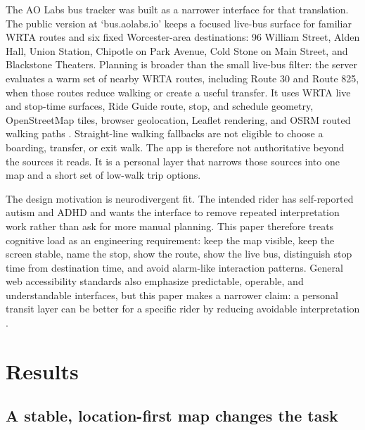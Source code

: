 \documentclass[12pt,letterpaper]{article}
\begin{document}
The AO Labs bus tracker was built as a narrower interface for that translation. The public version at `bus.aolabs.io' keeps a focused live-bus surface for familiar WRTA routes and six fixed Worcester-area destinations: 96 William Street, Alden Hall, Union Station, Chipotle on Park Avenue, Cold Stone on Main Street, and Blackstone Theaters. Planning is broader than the small live-bus filter: the server evaluates a warm set of nearby WRTA routes, including Route 30 and Route 825, when those routes reduce walking or create a useful transfer. It uses WRTA live and stop-time surfaces, Ride Guide route, stop, and schedule geometry, OpenStreetMap tiles, browser geolocation, Leaflet rendering, and OSRM routed walking paths \cite{rideGuide,gtfsSchedule,gtfsRealtimeBestPractices,osm,leaflet,geolocationApi,osrm}. Straight-line walking fallbacks are not eligible to choose a boarding, transfer, or exit walk. The app is therefore not authoritative beyond the sources it reads. It is a personal layer that narrows those sources into one map and a short set of low-walk trip options.

The design motivation is neurodivergent fit. The intended rider has self-reported autism and ADHD and wants the interface to remove repeated interpretation work rather than ask for more manual planning. This paper therefore treats cognitive load as an engineering requirement: keep the map visible, keep the screen stable, name the stop, show the route, show the live bus, distinguish stop time from destination time, and avoid alarm-like interaction patterns. General web accessibility standards also emphasize predictable, operable, and understandable interfaces, but this paper makes a narrower claim: a personal transit layer can be better for a specific rider by reducing avoidable interpretation \cite{wcag22}.

\section{Results}

\subsection{A stable, location-first map changes the task}
\end{document}
